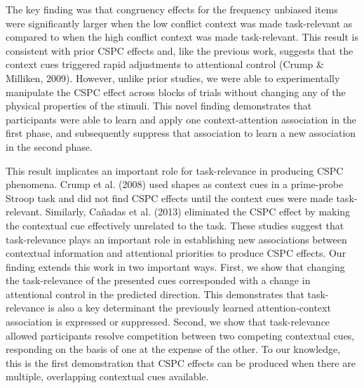 \documentclass[english,,man,floatsintext]{apa6}
\begin{document}
The key finding was that congruency effects for the frequency unbiased items were significantly larger when the low conflict context was made task-relevant as compared to when the high conflict context was made task-relevant. This result is consistent with prior CSPC effects and, like the previous work, suggests that the context cues triggered rapid adjustments to attentional control (Crump \& Milliken, 2009). However, unlike prior studies, we were able to experimentally manipulate the CSPC effect across blocks of trials without changing any of the physical properties of the stimuli. This novel finding demonstrates that participants were able to learn and apply one context-attention association in the first phase, and subsequently suppress that association to learn a new association in the second phase.

This result implicates an important role for task-relevance in producing CSPC phenomena. Crump et al. (2008) used shapes as context cues in a prime-probe Stroop task and did not find CSPC effects until the context cues were made task-relevant. Similarly, Cañadas et al. (2013) eliminated the CSPC effect by making the contextual cue effectively unrelated to the task. These studies suggest that task-relevance plays an important role in establishing new associations between contextual information and attentional priorities to produce CSPC effects. Our finding extends this work in two important ways. First, we show that changing the task-relevance of the presented cues corresponded with a change in attentional control in the predicted direction. This demonstrates that task-relevance is also a key determinant the previously learned attention-context association is expressed or suppressed. Second, we show that task-relevance allowed participants resolve competition between two competing contextual cues, responding on the basis of one at the expense of the other. To our knowledge, this is the first demonstration that CSPC effects can be produced when there are multiple, overlapping contextual cues available.
\end{document}
